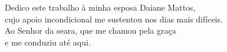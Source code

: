 \begin{dedicatoria}
  \vspace*{\fill}
  \begin{flushright}
    Dedico este trabalho à minha esposa Daiane Mattos,\\
    cujo apoio incondicional me sustentou nos dias mais difíceis.\\
    Ao Senhor da seara, que me chamou pela graça\\
    e me conduziu até aqui.
  \end{flushright}
\end{dedicatoria}
